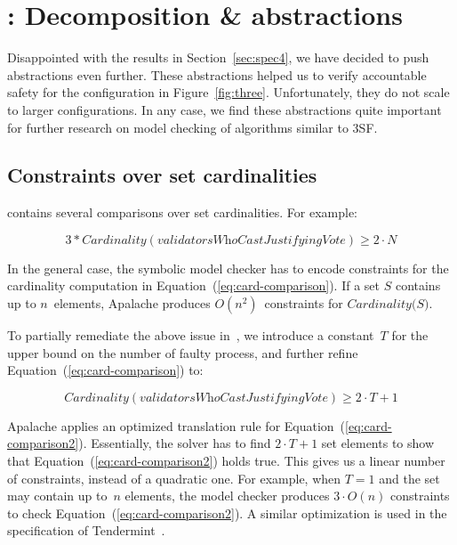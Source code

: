 
\section{\SpecFourB{}: Decomposition \& abstractions}\label{sec:spec4b}

Disappointed with the results in Section~\ref{sec:spec4}, we have decided to
push abstractions even further. These abstractions helped us to verify
accountable safety for the configuration in Figure~\ref{fig:three}.
Unfortunately, they do not scale to larger configurations. In any case, we
find these abstractions quite important for further research on model checking
of algorithms similar to 3SF\@.

\subsection{Constraints over set cardinalities}

\SpecThree{} contains several comparisons over set cardinalities. For example:

\begin{equation}
    3 * \textit{Cardinality}(\textit{validatorsWhoCastJustifyingVote}) \ge 2 \cdot N
    \label{eq:card-comparison}
\end{equation}

In the general case, the symbolic model checker has to encode constraints for
the cardinality computation in Equation~(\ref{eq:card-comparison}). If a set
$S$ contains up to $n$~elements, Apalache produces $O(n^2)$~constraints for
$\textit{Cardinality(S)}$.

To partially remediate the above issue in~\SpecFour{}, we introduce a
constant~$T$ for the upper bound on the number of faulty process, and further
refine Equation~(\ref{eq:card-comparison}) to:

\begin{equation}
    \textit{Cardinality}(\textit{validatorsWhoCastJustifyingVote}) \ge 2 \cdot T + 1
    \label{eq:card-comparison2}
\end{equation}

Apalache applies an optimized translation rule for
Equation~(\ref{eq:card-comparison2}). Essentially, the solver has to find $2
\cdot T + 1$ set elements to show that Equation~(\ref{eq:card-comparison2})
holds true. This gives us a linear number of constraints, instead of a
quadratic one. For example, when $T=1$ and the set may contain up to~$n$
elements, the model checker produces $3 \cdot O(n)$ constraints to check
Equation~(\ref{eq:card-comparison2}). A similar optimization is used in the
specification of Tendermint~\cite{TendermintSpec2020}.

